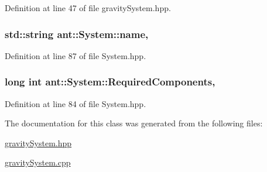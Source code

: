 Definition at line 47 of file gravity\+System.\+hpp.

\hypertarget{classant_1_1_system_a60b3c00a760a3b4947ab1f1fc534a5b2}{
\subsubsection[{name}]{\setlength{\rightskip}{0pt plus 5cm}std\+::string ant\+::\+System\+::name\hspace{0.3cm}{\ttfamily [protected]}, {\ttfamily [inherited]}}}\label{classant_1_1_system_a60b3c00a760a3b4947ab1f1fc534a5b2}


Definition at line 87 of file System.\+hpp.

\hypertarget{classant_1_1_system_a4ef41cfc496e41ac6730f90629524ec7}{
\subsubsection[{Required\+Components}]{\setlength{\rightskip}{0pt plus 5cm}long int ant\+::\+System\+::\+Required\+Components\hspace{0.3cm}{\ttfamily [protected]}, {\ttfamily [inherited]}}}\label{classant_1_1_system_a4ef41cfc496e41ac6730f90629524ec7}


Definition at line 84 of file System.\+hpp.



The documentation for this class was generated from the following files\+:\begin{DoxyCompactItemize}
\item 
\hyperlink{gravity_system_8hpp}{gravity\+System.\+hpp}\item 
\hyperlink{gravity_system_8cpp}{gravity\+System.\+cpp}\end{DoxyCompactItemize}
